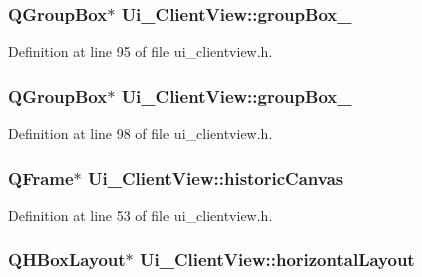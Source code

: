 \subsubsection[{group\+Box\+\_\+7}]{\setlength{\rightskip}{0pt plus 5cm}Q\+Group\+Box$\ast$ Ui\+\_\+\+Client\+View\+::group\+Box\+\_}\label{class_ui___client_view_a3c3b68713d02d91d0e03bbb7606d8d87}


Definition at line 95 of file ui\+\_\+clientview.\+h.

\hypertarget{class_ui___client_view_a3a9fd7a67b50cb8dcbf30f078068f510}{}
\subsubsection[{group\+Box\+\_\+8}]{\setlength{\rightskip}{0pt plus 5cm}Q\+Group\+Box$\ast$ Ui\+\_\+\+Client\+View\+::group\+Box\+\_}\label{class_ui___client_view_a3a9fd7a67b50cb8dcbf30f078068f510}


Definition at line 98 of file ui\+\_\+clientview.\+h.

\hypertarget{class_ui___client_view_a7722a57944617680775c3ea9bfbfb797}{}
\subsubsection[{historic\+Canvas}]{\setlength{\rightskip}{0pt plus 5cm}Q\+Frame$\ast$ Ui\+\_\+\+Client\+View\+::historic\+Canvas}\label{class_ui___client_view_a7722a57944617680775c3ea9bfbfb797}


Definition at line 53 of file ui\+\_\+clientview.\+h.

\hypertarget{class_ui___client_view_a508aef0ee91fd84825dbc5c8aa7cdeb0}{}
\subsubsection[{horizontal\+Layout}]{\setlength{\rightskip}{0pt plus 5cm}Q\+H\+Box\+Layout$\ast$ Ui\+\_\+\+Client\+View\+::horizontal\+Layout}\label{class_ui___client_view_a508aef0ee91fd84825dbc5c8aa7cdeb0}


